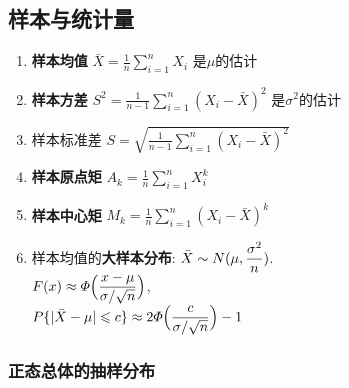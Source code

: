 \subsection{样本与统计量}

\begin{enumerate}
\item {\bf 样本均值} $\bar{X}=\frac{1}{n}\sum_{i=1}^{n}X_i$ 是$\mu$的估计
\item {\bf 样本方差} $S^2=\frac{1}{n-1}\sum_{i=1}^{n}(X_i-\bar{X})^2$ 是$\sigma^2$的估计
\item 样本标准差 $S=\sqrt{\frac{1}{n-1}\sum_{i=1}^{n}(X_i-\bar{X})^2}$
\item {\bf 样本原点矩} $A_k=\frac{1}{n}\sum_{i=1}^{n}X_i^k$
\item {\bf 样本中心矩} $M_k=\frac{1}{n}\sum_{i=1}^{n}(X_i-\bar{X})^k$
\item 样本均值的{\bf 大样本分布}: $\displaystyle\bar{X}\sim N(\mu,\frac{\sigma^2}{n})$.\\
$\displaystyle F(x)\approx\varPhi\Big(\frac{x-\mu}{\sigma/\sqrt{n}}\Big)$,\\
$\displaystyle P\{|\bar{X}-\mu|\leqslant c\}\approx 2\varPhi\Big(\frac{c}{\sigma/\sqrt{n}}\Big)-1$

\end{enumerate}

\subsubsection*{正态总体的抽样分布}

